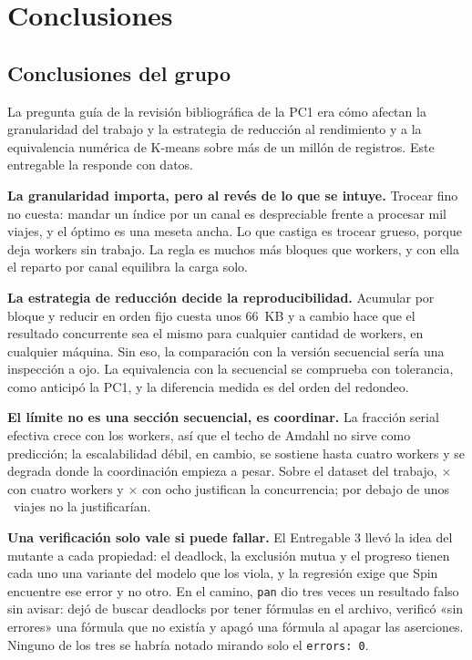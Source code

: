 \section{Conclusiones}\label{sec:conclusiones}

\subsection{Conclusiones del grupo}

La pregunta guía de la revisión bibliográfica de la PC1 era cómo afectan la granularidad del trabajo
y la estrategia de reducción al rendimiento y a la equivalencia numérica de K-means sobre más de un
millón de registros. Este entregable la responde con datos.

\textbf{La granularidad importa, pero al revés de lo que se intuye.} Trocear fino no cuesta: mandar
un índice por un canal es despreciable frente a procesar mil viajes, y el óptimo es una meseta ancha.
Lo que castiga es trocear grueso, porque deja workers sin trabajo. La regla es muchos más bloques que
workers, y con ella el reparto por canal equilibra la carga solo.

\textbf{La estrategia de reducción decide la reproducibilidad.} Acumular por bloque y reducir en
orden fijo cuesta unos 66~KB y a cambio hace que el resultado concurrente sea el mismo para
cualquier cantidad de workers, en cualquier máquina. Sin eso, la comparación con la versión
secuencial sería una inspección a ojo. La equivalencia con la secuencial se comprueba con tolerancia,
como anticipó la PC1, y la diferencia medida es del orden del redondeo.

\textbf{El límite no es una sección secuencial, es coordinar.} La fracción serial efectiva crece con
los workers, así que el techo de Amdahl no sirve como predicción; la escalabilidad débil, en cambio,
se sostiene hasta cuatro workers y se degrada donde la coordinación empieza a pesar. Sobre el
dataset del trabajo, $\times$ con cuatro workers y $\times$ con
ocho justifican la concurrencia; por debajo de unos ~viajes no la justificarían.

\textbf{Una verificación solo vale si puede fallar.} El Entregable 3 llevó la idea del mutante a
cada propiedad: el deadlock, la exclusión mutua y el progreso tienen cada uno una variante del
modelo que los viola, y la regresión exige que Spin encuentre ese error y no otro. En el camino,
\texttt{pan} dio tres veces un resultado falso sin avisar: dejó de buscar deadlocks por tener
fórmulas en el archivo, verificó «sin errores» una fórmula que no existía y apagó una fórmula al
apagar las aserciones. Ninguno de los tres se habría notado mirando solo el \texttt{errors: 0}.

